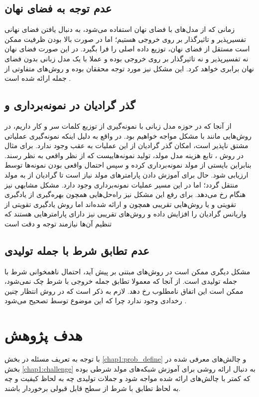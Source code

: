  \subsection{عدم توجه به فضای نهان} \label{chap1:latent_ignore}
 زمانی که از مدل‌های با فضای نهان استفاده می‌شود، به دنبال یافتن فضای نهانی تفسیرپذیر و تاثیرگذار بر روی خروجی \decoder{} هستیم؛ اما در صورت بالا بودن ظرفیت \decoder{} ممکن است مستقل از فضای نهان، توزیع داده اصلی را فرا بگیرد. در این صورت فضای نهان نه تفسیرپذیر و نه تاثیرگذار بر روی خروجی \decoder{} بوده و عملا با یک مدل زبانی بدون فضای نهان برابری خواهد کرد. این مشکل نیز مورد توجه محققان بوده و روش‌های متفاوتی از جمله  ارائه شده است \cite{wae, infovae, vae_lagging, vae_lossy}.
 \subsection{گذر گرادیان در نمونه‌برداری و
     }
از آنجا که در حوزه مدل زبانی با نمونه‌گیری از توزیع کلمات سر و کار داریم، در روش‌هایی مانند \gan{} با مشکل مواجه خواهیم بود. در واقع به دلیل اینکه نمونه‌گیری عملیاتی مشتق نا‌پذیر است، امکان گذر گرادیان از این عملیات به عقب وجود ندارد. برای مثال در روش \gan{}، تابع هزینه مدل مولد، تولید نمونه‌هاییست که از نظر \discriminator{} واقعی به نظر رسند. بنابراین بایستی از مولد نمونه‌برداری کرده و سپس احتمال واقعی بودن نمونه‌ها توسط \discriminator{} ارزیابی شود. حال برای آموزش دادن پارامتر‌های مولد نیاز است تا گرادیان از \discriminator{} به مولد منتقل گردد؛ اما در این مسیر عملیات نمونه‌برداری وجود دارد. مشکل مشابهی نیز هنگام \argmaxphrase{} رخ می‌دهد. برای رفع این مشکل نیز راه‌حل‌هایی همچون بهره‌گیری از یادگیری تقویتی و یا روش‌هایی تقریبی همچون  و  ارائه شده‌اند اما روش یادگیری تقویتی از واریانس گرادیان را افزایش داده و روش‌های تقریبی نیز دارای پارامتر‌هایی هستند که تنظیم آن‌ها نیازمند توجه و دقت است \cite{seqgan, gumbel}
\subsection{عدم تطابق شرط با جمله تولیدی}
مشکل دیگری ممکن است در روش‌های مبتنی بر \likelihood{} پیش آید، احتمال ناهمخوانی شرط با جمله تولیدی است. از آنجا که معمولا تطابق جمله خروجی با شرط چک نمی‌شود، ممکن است این اتفاق نامطلوب رخ دهد. لازم به ذکر است که در روش \gan{} انتظار چنین رخدادی وجود ندارد چرا که این موضوع توسط \discriminator{} تصحیح می‌شود \cite{toward}.
\section{هدف پژوهش}
با توجه به تعریف مسئله در بخش \ref{chap1:prob_define} و چالش‌های معرفی شده در بخش \ref{chap1:challenge} به دنبال ارائه روشی برای آموزش شبکه‌های مولد شرطی بوده که کمتر با چالش‌های ارائه شده مواجه شود و جملات تولیدی چه به لحاظ کیفیت و چه به لحاظ تطابق با شرط از سطح قابل قبولی برخوردار باشند.

